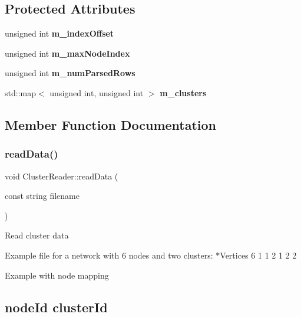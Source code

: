 \subsection*{Protected Attributes}
\begin{DoxyCompactItemize}
\item 
\mbox{\label{classClusterReader_a04047a469649facf81fba3353e3457d5}} 
unsigned int {\bfseries m\+\_\+index\+Offset}
\item 
\mbox{\label{classClusterReader_a9cc0ebe54347e80271bc28d0cd83f43f}} 
unsigned int {\bfseries m\+\_\+max\+Node\+Index}
\item 
\mbox{\label{classClusterReader_ae92f801ecb6228dbbadc8d77bdb5a64e}} 
unsigned int {\bfseries m\+\_\+num\+Parsed\+Rows}
\item 
\mbox{\label{classClusterReader_ac3974e9a56340f631b2f19ff3e44fc72}} 
std\+::map$<$ unsigned int, unsigned int $>$ {\bfseries m\+\_\+clusters}
\end{DoxyCompactItemize}


\subsection{Member Function Documentation}
\mbox{\label{classClusterReader_a45764db9840cc4f9eb97a6cab5de9823}} 
\subsubsection{\texorpdfstring{read\+Data()}{readData()}}
{\footnotesize\ttfamily void Cluster\+Reader\+::read\+Data (\begin{DoxyParamCaption}\item[{const string}]{filename }\end{DoxyParamCaption})\hspace{0.3cm}{\ttfamily [virtual]}}

Read cluster data

Example file for a network with 6 nodes and two clusters\+: $\ast$\+Vertices 6 1 1 2 1 2 2

Example with node mapping \subsection*{node\+Id cluster\+Id}

